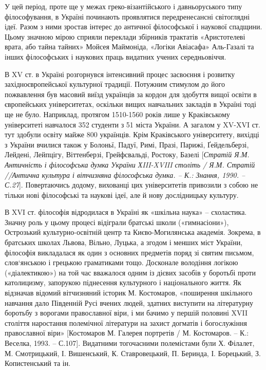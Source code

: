 У цей період, проте ще у межах греко-візантійського і давньоруського типу
філософування, в Україні починають проявлятися передренесансні світоглядні
ідеї. Разом з ними зростав інтерес до античної філософської і наукової
спадщини. Цьому значною мірою сприяли переклади збірників трактатів
«Аристотелеві врата, або тайна тайних» Мойсея Маймоніда, «Логіки Авіасафа»
Аль-Газалі та інших філософських і наукових праць видатних учених
середньовіччя.

В XV ст. в Україні розгорнувся інтенсивний процес засвоєння і розвитку
західноєвропейської культурної традиції. Потужним стимулом до його
пожвавлення був масовий виїзд українців за кордон для здобуття вищої освіти в
європейських університетах, оскільки вищих навчальних закладів в Україні
тоді ще не було. Наприклад, протягом 1510-1560 років лише у Краківському
університеті навчалося 352 студенти з 51 міста України. А загалом у XV-XVI
ст. тут здобули освіту майже 800 українців. Крім Краківського університету,
вихідці з України вчилися також у Болоньї, Падуї, Римі, Празі, Парижі,
Ґейдельберзі, Лейдені, Лейпцігу, Віттенберзі, Грейфсвальді, Ростоку, Базелі
[\textit{Стратій Я.М. Античність і філософська думка України ХIII-XVIII століть /
Я.М. Стратій //Антична культура і вітчизняна філософська думка. –
К.: Знання, 1990. – С.27}]. Повертаючись додому, вихованці цих університетів
привозили з собою не тільки нові філософські та наукові ідеї, але й нову
дослідницьку культуру.

В XVI ст. філософія відродилася в Україні як «шкільна наука» – схоластика.
Значну роль у цьому процесі відіграли братські школи («гимнасіони»),
Острозький культурно-освітній центр та Києво-Могилянська академія. Зокрема,
в братських школах Львова, Вільно, Луцька, а згодом і менших міст України,
філософія викладалася як один з основних предметів поряд зі святим письмом,
слов`янською і грецькою граматиками тощо. Досконале володіння логікою
(«діалектикою») на той час вважалося одним із дієвих засобів у боротьбі проти
католицизму, запорукою піднесення культурного і національного життя. Як
відзначав відомий вітчизняний історик М. Костомаров, «поширення шкільного
навчання дало Південній Русі вчених людей, здатних виступити на літературну
боротьбу з ворогами православної віри, і ми бачимо у першій половині XVII
століття наростання полемічної літератури на захист догматів і богослужіння
православної віри» [Костомаров М. Галерея портретів / М. Костомаров. – К.:
Веселка, 1993. – С.107]. Видатними тогочасними полемістами були Х. Філалет,
М. Смотрицький, І. Вишенський, К. Ставровецький, П. Беринда, І. Борецький,
З. Копистенський та ін.

